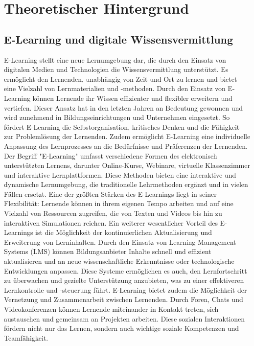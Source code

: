 \chapter{Theoretischer Hintergrund}
\section{E-Learning und digitale Wissensvermittlung}
E-Learning stellt eine neue Lernumgebung dar, die durch den Einsatz von digitalen Medien und Technologien die Wissensvermittlung unterstützt. Es ermöglicht den Lernenden, unabhängig von Zeit und Ort zu lernen und bietet eine Vielzahl von Lernmaterialien und -methoden. Durch den Einsatz von E-Learning können Lernende ihr Wissen effizienter und flexibler erweitern und vertiefen. Dieser Ansatz hat in den letzten Jahren an Bedeutung gewonnen und wird zunehmend in Bildungseinrichtungen und Unternehmen eingesetzt. So fördert E-Learning die Selbstorganisation, kritisches Denken und die Fähigkeit zur Problemlösung der Lernenden. %
Zudem ermöglicht E-Learning eine individuelle Anpassung des Lernprozesses an die Bedürfnisse und Präferenzen der Lernenden.
Der Begriff "E-Learning" umfasst verschiedene Formen des elektronisch unterstützten Lernens, darunter Online-Kurse, Webinare, virtuelle Klassenzimmer und interaktive Lernplattformen. Diese Methoden bieten eine interaktive und dynamische Lernumgebung, die traditionelle Lehrmethoden ergänzt und in vielen Fällen ersetzt. Eine der größten Stärken des E-Learnings liegt in seiner Flexibilität: Lernende können in ihrem eigenen Tempo arbeiten und auf eine Vielzahl von Ressourcen zugreifen, die von Texten und Videos bis hin zu interaktiven Simulationen reichen.
Ein weiterer wesentlicher Vorteil des E-Learnings ist die Möglichkeit der kontinuierlichen Aktualisierung und Erweiterung von Lerninhalten. Durch den Einsatz von Learning Management Systems (LMS) können Bildungsanbieter Inhalte schnell und effizient aktualisieren und an neue wissenschaftliche Erkenntnisse oder technologische Entwicklungen anpassen. Diese Systeme ermöglichen es auch, den Lernfortschritt zu überwachen und gezielte Unterstützung anzubieten, was zu einer effektiveren Lernkontrolle und -steuerung führt.
E-Learning bietet zudem die Möglichkeit der Vernetzung und Zusammenarbeit zwischen Lernenden. Durch Foren, Chats und Videokonferenzen können Lernende miteinander in Kontakt treten, sich austauschen und gemeinsam an Projekten arbeiten. Diese sozialen Interaktionen fördern nicht nur das Lernen, sondern auch wichtige soziale Kompetenzen und Teamfähigkeit.
